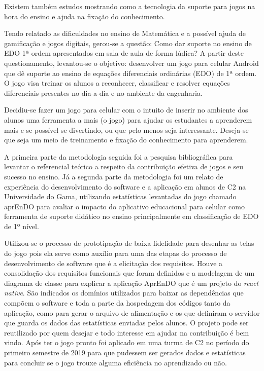 Existem também estudos mostrando como a tecnologia da suporte para jogos na hora do ensino e ajuda na fixação do conhecimento. 

Tendo relatado as dificuldades no ensino de Matemática e a possível ajuda de gamificação e jogos digitais, gerou-se a questão: Como dar suporte no ensino de EDO 1ª ordem apresentados em sala de aula de forma lúdica? A partir deste questionamento, levantou-se o objetivo: desenvolver um jogo para celular Android que dê suporte ao ensino de equações diferenciais ordinárias (EDO) de 1ª ordem. O jogo visa treinar os alunos a reconhecer, classificar e resolver equações diferenciais presentes no dia-a-dia e no ambiente da engenharia.

Decidiu-se fazer um jogo para celular com o intuito de inserir no ambiente dos alunos uma ferramenta a mais (o jogo) para ajudar os estudantes a aprenderem mais e se possível se divertindo, ou que pelo menos seja interessante. Deseja-se que seja um meio de treinamento e fixação do conhecimento para aprenderem.

A primeira parte da metodologia seguida foi a pesquisa bibliográfica para levantar o referencial teórico a respeito da contribuição efetiva de jogos e seu sucesso no ensino. Já a segunda parte da metodologia foi um relato de experiência do desenvolvimento do software e a aplicação em alunos de C2 na Universidade do Gama, utilizando estatísticas levantadas do jogo chamado aprEnDO para avaliar o impacto do aplicativo educacional para celular como ferramenta de suporte didático no ensino principalmente em classificação de EDO de 1º nível.

Utilizou-se o processo de prototipação de baixa fidelidade para desenhar as telas do jogo pois ela serve como auxílio para uma das etapas do processo de desenvolvimento de software que é a elicitação dos requisitos. Houve a consolidação dos requisitos funcionais que foram definidos e a modelagem de um diagrama de classe para explicar a aplicação AprEnDO que é um projeto do \textit{react native}. São indicados os domínios utilizados para baixar as dependências que compõem o software e toda a parte da hospedagem dos códigos tanto da aplicação, como para gerar o arquivo de alimentação e os que definiram o servidor que guarda os dados das estatísticas enviadas pelos alunos. O projeto pode ser reutilizado por quem desejar e todo interesse em ajudar na contribuição é bem vindo. Após ter o jogo pronto foi aplicado em uma turma de C2 no período do primeiro semestre de 2019 para que pudessem ser gerados dados e estatísticas para concluir se o jogo trouxe alguma eficiência no aprendizado ou não.

